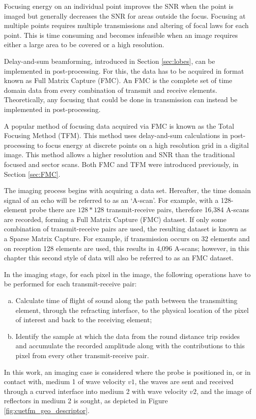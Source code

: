 Focusing energy on an individual point improves the SNR when the point is imaged but generally decreases the SNR for areas outside the focus. Focusing at multiple points requires multiple transmissions and altering of focal laws for each point. This is time consuming and becomes infeasible when an image requires either a large area to be covered or a high resolution.

Delay-and-sum beamforming, introduced in Section \ref{sec:lobes}, can be implemented in post-processing\cite{holmes_post-processing_2005}. For this, the data has to be acquired in format known as Full Matrix Capture (FMC). An FMC is the complete set of time domain data from every combination of transmit and receive elements. Theoretically, any focusing that could be done in transmission can instead be implemented in post-processing.

A popular method of focusing data acquired via FMC is known as the Total Focusing Method (TFM). This method uses delay-and-sum calculations in post-processing to  focus energy at discrete points on a high resolution grid in a digital image. This method allows a higher resolution and SNR than the traditional focused and sector scans. Both FMC and TFM were introduced previously, in Section \ref{sec:FMC}.

The imaging process begins with acquiring a data set. Hereafter, the time domain signal of an echo will be referred to as an `A-scan'. For example, with a 128-element probe there are $128*128$ transmit-receive pairs, therefore 16,384 A-scans are recorded, forming a Full Matrix Capture (FMC) dataset. If only some combination of transmit-receive pairs are used, the resulting dataset is known as a Sparse Matrix Capture\cite{reverdy_advanced_2012}. For example, if transmission occurs on 32 elements and on reception 128 elements are used, this results in 4,096 A-scans; however, in this chapter this second style of data will also be referred to as an FMC dataset.

In the imaging stage, for each pixel in the image, the following operations have to be performed for each transmit-receive pair:
\begin{enumerate}[a)]
\item Calculate time of flight of sound along the path between the transmitting element, through the refracting interface, to the physical location of the pixel of interest and back to the receiving element;
\item Identify the sample at which the data from the round distance trip resides and accumulate the recorded amplitude along with the contributions to this pixel from every other transmit-receive pair. 
\end{enumerate}
In this work, an imaging case is considered where the probe is positioned in, or in contact with, medium 1 of wave velocity $v1$, the waves are sent and received through a curved interface into medium 2 with wave velocity $v2$, and the image of reflectors in medium 2 is sought, as depicted in Figure \ref{fig:cuetfm_geo_descriptor}.

